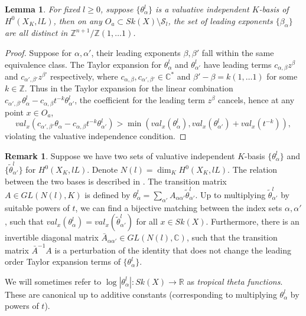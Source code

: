 \documentclass[a4paper]{article}
\newtheorem{lem}[thm]{Lemma}
\theoremstyle{definition}
\newtheorem{rmk}[thm]{Remark}
\newcommand{\R}{\mathbb{R}}
\newcommand{\C}{\mathbb{C}}
\newcommand{\Z}{\mathbb{Z}}
\begin{document}
\begin{lem}\cite[Lemma 3.6]{Litheta}
	\label{lem:valuativeindependence2} For fixed $l\geq 0$, 
	suppose $\{ \theta_\alpha^l \}$ is a valuative independent $K$-basis of $H^0(X_K, lL)$, then on any $O_a\subset Sk(X)\setminus \mathcal{S}_l$, the set of leading exponents $\{ \beta_\alpha\}$ are all distinct in $\Z^{n+1}/\Z(1,\ldots 1)$.
	
	
\end{lem}



\begin{proof}
Suppose for $\alpha, \alpha'$, their leading exponents $\beta, \beta'$ fall within the same equivalence class.  The Taylor expansion for $\theta_\alpha^l$ and $\theta_{\alpha'}^l$ have leading terms $c_{\alpha, \beta} z^\beta $ and $c_{\alpha', \beta'} z^{\beta'}$ respectively, where $  c_{\alpha, \beta} ,  c_{\alpha', \beta'} \in \C^*$ and   $\beta'- \beta= k(1,\ldots 1)$ for some $k\in \Z$. Thus
in the Taylor expansion for the linear combination $c_{\alpha', \beta'} \theta_\alpha^l - c_{\alpha, \beta} t^{-k} \theta_{\alpha'}^l$, the coefficient for the leading term $z^\beta$ cancels, hence at any point $x\in O_a$,
\[
val_x (    c_{\alpha', \beta'} \theta_\alpha - c_{\alpha, \beta} t^{-k} \theta_{\alpha'}^l    ) > \min( val_x(\theta_\alpha^l),  val_x(\theta_{\alpha'}^l) + val_x(  t^{-k} ) ),
\]
violating the valuative independence condition. 
\end{proof}

	

	
	
	
	\begin{rmk}
	Suppose we have two sets of valuative independent $K$-basis $\{  \theta_\alpha^l  \}$ and $\{ \tilde{\theta}_{\alpha'}^l \}$ for $H^0(X_K, lL)$. Denote $N(l)=\dim_K H^0(X_K, lL)$.
The relation between the two bases is described in  \cite[Remark 3.8]{Litheta}. The transition matrix $A\in GL(N(l), K)$ is defined by 
$
\theta_\alpha^l = \sum_{\alpha'} A_{\alpha \alpha'} \tilde{\theta}_{\alpha'}^l.
$
Up to multiplying $\tilde{\theta}_{\alpha'}^l$ by suitable powers of $t$, we can find a bijective matching between the index sets $\alpha, \alpha'$, such that $val_x(\theta_\alpha^l)= val_x(\tilde{\theta}_{\alpha'}^l)$ for all $x\in   Sk(X)$. Furthermore, there is an invertible diagonal matrix $\bar{A}_{\alpha \alpha'}\in GL(N(l), \C)$, such that the transition matrix $\bar{A}^{-1}A$ is a perturbation of the identity that does not change the leading order Taylor expansion terms of $\{  \theta_\alpha^l \}$.
	
	
	
We will sometimes refer to $\log |\theta_\alpha^l|: Sk(X)\to \R$ as \emph{tropical theta functions}.
	These are canonical up to additive constants (corresponding to multiplying $\theta_\alpha^l$ by powers of $t$).
	\end{rmk}
	
\end{document}
